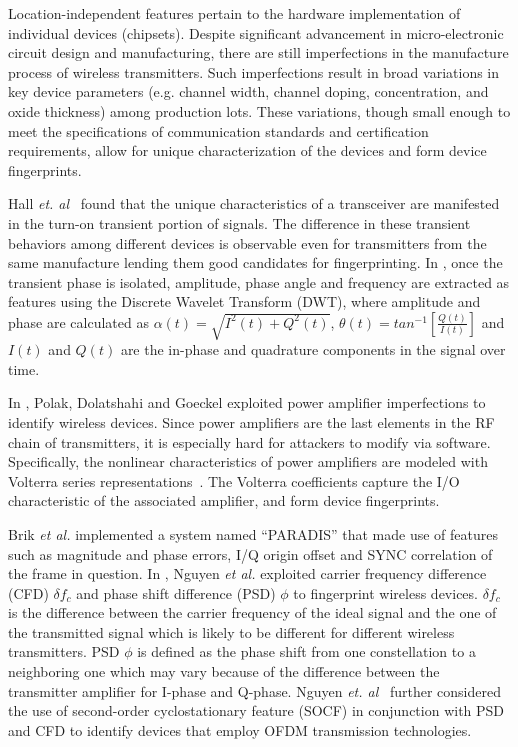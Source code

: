 \documentclass[journal,draftcls,onecolumn,11pt]{IEEEtran}
\newcounter{ctr}\setcounter{ctr}{0}
\begin{document}
Location-independent features pertain to the hardware implementation of individual devices (chipsets). Despite significant advancement in micro-electronic circuit design and manufacturing, there are still imperfections in the manufacture process of wireless transmitters\cite{Brik2008,Polak2011,Dolatshahi2010}.  Such imperfections result in broad variations in key device parameters (e.g.  channel width, channel doping, concentration, and oxide thickness) among production lots.  These variations, though small enough to meet the specifications of communication standards and certification requirements, allow for unique characterization of the devices and form device fingerprints.

Hall {\it et. al}~\cite{Hall2005} found that the unique characteristics of a transceiver are manifested in the turn-on transient portion of signals.  The difference in these transient behaviors among different devices is observable even for transmitters from the same manufacture lending them good candidates for fingerprinting. In \cite{Ureten2007,Hall2005}, once the transient phase is isolated, amplitude, phase angle and frequency are extracted as features using the Discrete Wavelet Transform (DWT), where amplitude and phase are calculated as $\alpha(t) = \sqrt{I^2(t) + Q^2(t)}$, $\theta(t) = tan^{-1}[\frac{Q(t)}{I(t)}]$ and $I(t)$ and $Q(t)$ are the in-phase and quadrature components in the signal over time.

In \cite{Polak2011,Dolatshahi2010}, Polak, Dolatshahi and Goeckel exploited power amplifier imperfections to identify wireless devices. Since power amplifiers are the last elements in the RF chain of transmitters, it is especially hard for attackers to modify via software. Specifically, the nonlinear characteristics of power amplifiers are modeled with Volterra series representations~\cite{Polak2011,Dolatshahi2010}. The Volterra coefficients capture the I/O characteristic of the associated amplifier, and form device fingerprints.

Brik {\it et al.} \cite{Brik2008} implemented a system named ``PARADIS'' that made use of features such as magnitude and phase errors, I/Q origin offset and SYNC correlation of the frame in question. In \cite{Nguyen2011}, Nguyen {\it et al.}  exploited carrier frequency difference (CFD) $\delta f_c$ and phase shift difference (PSD) $\phi$ to fingerprint wireless devices.  $\delta f_c$ is the difference between the carrier frequency of the ideal signal and the one of the transmitted signal which is likely to be different for different wireless transmitters. PSD $\phi$ is defined as the phase shift from one constellation to a neighboring one which may vary because of the difference between the transmitter amplifier for I-phase and Q-phase. Nguyen {\it et. al}~\cite{Nguyen2011} further considered the use of second-order cyclostationary feature (SOCF) in conjunction with PSD and CFD to identify devices that employ OFDM transmission technologies.
\end{document}
